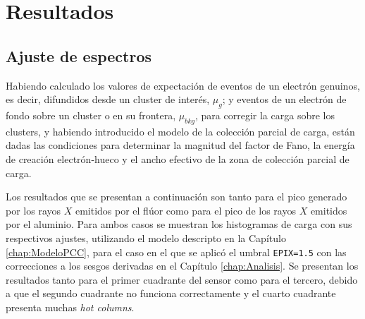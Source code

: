 \chapter{Resultados \label{chap:Resultados}}
\section{Ajuste de espectros}
\noindent Habiendo calculado los valores de expectación de eventos de un electrón genuinos, es decir, difundidos desde un cluster de interés, $\mu_{g}$; y eventos de un electrón de fondo sobre un cluster o en su frontera, $\mu_{bkg}$, para corregir la carga sobre los clusters, y habiendo introducido el modelo de la colección parcial de carga, están dadas las condiciones para determinar la magnitud del factor de Fano, la energía de creación electrón-hueco y el ancho efectivo de la zona de colección parcial de carga.

Los resultados que se presentan a continuación son tanto para el pico generado por los rayos $X$ emitidos por el flúor como para el pico de los rayos $X$ emitidos por el aluminio. Para ambos casos se muestran los histogramas de carga con sus respectivos ajustes, utilizando el modelo descripto en la Capítulo \ref{chap:ModeloPCC}, para el caso en el que se aplicó el umbral \verb|EPIX=1.5| con las correcciones a los sesgos derivadas en el Capítulo \ref{chap:Analisis}. 
Se presentan los resultados tanto para el primer cuadrante del sensor como para el tercero, debido a que el segundo cuadrante no funciona correctamente y el cuarto cuadrante presenta muchas \textit{hot columns}.


